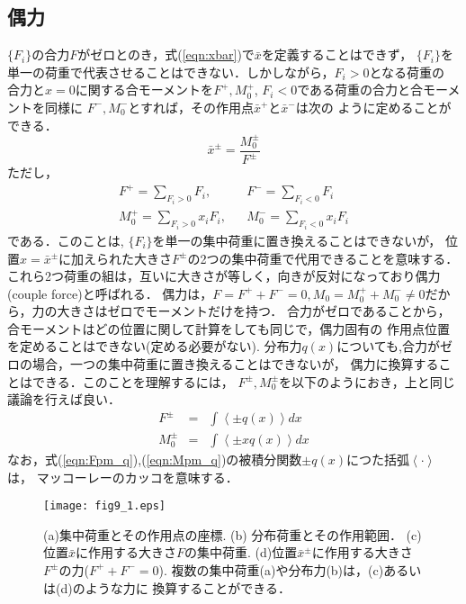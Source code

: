 \documentclass[10pt,a4j]{jarticle}
\begin{document}
\subsection{偶力}
$\{F_i\}$の合力$F$がゼロとのき，式(\ref{eqn:xbar})で$\bar x$を定義することはできず，
$\{F_i\}$を単一の荷重で代表させることはできない．しかしながら，$F_i >0$となる荷重の
合力と$x=0$に関する合モーメントを$F^+, M_0^+$, $F_i<0$である荷重の合力と合モーメントを同様に
$F^-, M_0^-$とすれば，その作用点$\bar x^+$と$\bar x^-$は次の
ように定めることができる．
\begin{equation}
	\bar x ^\pm = \frac{M_0^\pm }{F ^\pm} 
	\label{eqn:xbar_pm}
\end{equation}
ただし，
\begin{eqnarray}
	F^+ = \sum _{ F_i > 0 } F_i, & & F^- = \sum _{F_i < 0 } F_i 
	\label{eqn:F_pm}
	\\
	M_0^+ = \sum _{F_i > 0 } x_i F_i, & & M_0^- = \sum _{F_i < 0 } x_iF_i 
	\label{eqn:M_pm}
\end{eqnarray}
である．このことは, $\{F_i\}$を単一の集中荷重に置き換えることはできないが，
位置$x=\bar x ^\pm$に加えられた大きさ$F^\pm$の2つの集中荷重で代用できることを意味する．
これら2つ荷重の組は，互いに大きさが等しく，向きが反対になっており偶力(couple force)と呼ばれる．
偶力は，$F=F^++F^-=0, M_0=M_0^+ + M_0^-\neq 0$だから，力の大きさはゼロでモーメントだけを持つ．
合力がゼロであることから，合モーメントはどの位置に関して計算をしても同じで，偶力固有の
作用点位置を定めることはできない(定める必要がない). 
分布力$q(x)$についても,合力がゼロの場合，一つの集中荷重に置き換えることはできないが，
偶力に換算することはできる．このことを理解するには，
$F^\pm, M_0^\pm$を以下のようにおき，上と同じ議論を行えば良い．
\begin{eqnarray}
	F^\pm &=& \int \left< \pm q(x) \right>dx
	\label{eqn:Fpm_q} \\
	M_0^\pm &=& \int \left< \pm xq(x) \right>dx
	\label{eqn:Mpm_q}
\end{eqnarray}
なお，式(\ref{eqn:Fpm_q}),(\ref{eqn:Mpm_q})の被積分関数$\pm q(x)$につた括弧$\left< \cdot \right>$は，
マッコーレーのカッコを意味する．
\begin{figure}[h]
	\begin{center}
	\texttt{[image: fig9\_1.eps]} 
	\end{center}
	\caption{
		(a)集中荷重とその作用点の座標. (b) 分布荷重とその作用範囲．
		(c)位置$\bar x$に作用する大きさ$F$の集中荷重. 
		(d)位置$\bar x^\pm$に作用する大きさ$F^\pm$の力($F^++F^-=0$). 
		複数の集中荷重(a)や分布力(b)は，(c)あるいは(d)のような力に
		換算することができる．
	} 
	\label{fig:fig9_1}
\end{figure}
\end{document}
